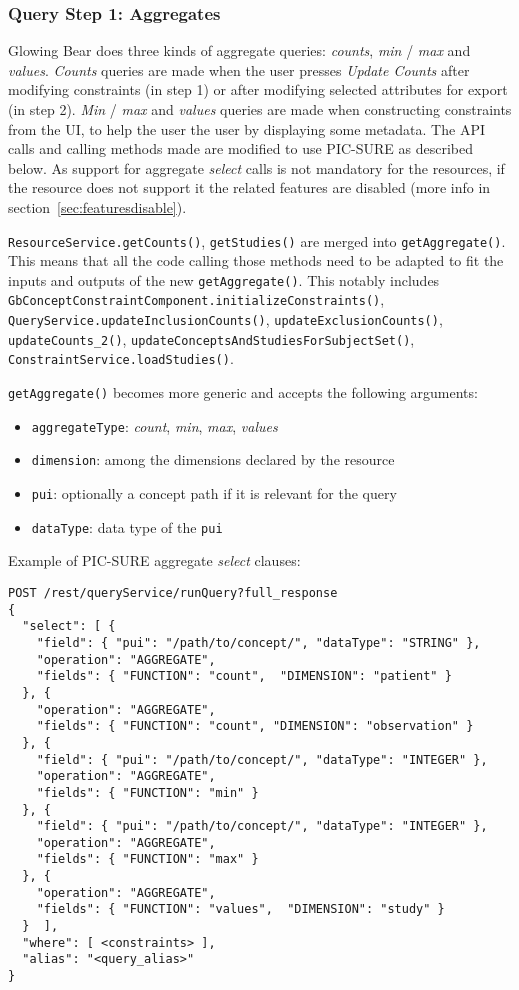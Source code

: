 \subsubsection{Query Step 1: Aggregates}
\label{sec:gb-step1-aggregates}

Glowing Bear does three kinds of aggregate queries: \emph{counts}, \emph{min} / \emph{max} and \emph{values}. 
\emph{Counts} queries are made when the user presses \emph{Update Counts} after modifying constraints (in step 1) or after modifying selected attributes for export (in step 2).
\emph{Min} / \emph{max} and \emph{values} queries are made when constructing constraints from the UI, to help the user the user by displaying some metadata.
The API calls and calling methods made are modified to use PIC-SURE as described below.
As support for aggregate \emph{select} calls is not mandatory for the resources, if the resource does not support it the related features are disabled (more info in section~\ref{sec:featuresdisable}).

\verb|ResourceService.getCounts()|, \verb|getStudies()| are merged into \verb|getAggregate()|.
This means that all the code calling those methods need to be adapted to fit the inputs and outputs of the new \verb|getAggregate()|.
This notably includes \verb|GbConceptConstraintComponent.initializeConstraints()|, \verb|QueryService.updateInclusionCounts()|, \verb|updateExclusionCounts()|, \verb|updateCounts_2()|, \verb|updateConceptsAndStudiesForSubjectSet()|, \verb|ConstraintService.loadStudies()|.

\verb|getAggregate()| becomes more generic and accepts the following arguments:
\begin{itemize}
    \item \verb|aggregateType|: \emph{count}, \emph{min}, \emph{max}, \emph{values}
    \item \verb|dimension|: among the dimensions declared by the resource
    \item \verb|pui|: optionally a concept path if it is relevant for the query
    \item \verb|dataType|: data type of the \verb|pui|
\end{itemize}

Example of PIC-SURE aggregate \emph{select} clauses:
\begin{verbatim}
POST /rest/queryService/runQuery?full_response
{
  "select": [ {
    "field": { "pui": "/path/to/concept/", "dataType": "STRING" },
    "operation": "AGGREGATE",
    "fields": { "FUNCTION": "count",  "DIMENSION": "patient" }
  }, {
    "operation": "AGGREGATE",
    "fields": { "FUNCTION": "count", "DIMENSION": "observation" }
  }, {
    "field": { "pui": "/path/to/concept/", "dataType": "INTEGER" },
    "operation": "AGGREGATE",
    "fields": { "FUNCTION": "min" }
  }, {
    "field": { "pui": "/path/to/concept/", "dataType": "INTEGER" },
    "operation": "AGGREGATE",
    "fields": { "FUNCTION": "max" }
  }, {
    "operation": "AGGREGATE",
    "fields": { "FUNCTION": "values",  "DIMENSION": "study" }
  }  ],
  "where": [ <constraints> ],
  "alias": "<query_alias>"
}
\end{verbatim}


